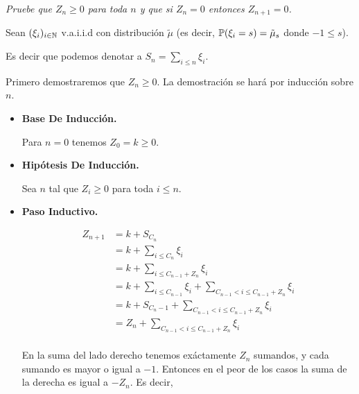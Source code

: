 \emph{
    Pruebe que $Z_n\geq 0$ para toda $n$ y que si $Z_n=0$ entonces $Z_{n+1}=0$.
}

\afterstatement\pn

Sean $(\xi_i)_{i \in \mathbb{N}}$ v.a.i.i.d con distribución $\tilde\mu$ 
(es decir, $\mathbb{P}(\xi_i = s) = \tilde\mu_s$ donde $-1 \leq s$).\pn

Es decir que podemos denotar a $S_n = \sum_{i \leq n} \xi_i$.\pn

Primero demostraremos que $Z_n \geq 0$. La demostración se hará por inducción sobre $n$.

\begin{itemize}
	\item 
        \textbf{Base De Inducción.}
        
        Para $n = 0$ tenemos $Z_0 = k \geq 0$.\pn
        
    \item
        \textbf{Hipótesis De Inducción.}
        
        Sea $n$ tal que $Z_i \geq 0$ para toda $i \leq n$.\pn
        
    \item
        \textbf{Paso Inductivo.}
        
        \begin{align} \label{problema4_2:descomposicion_de_Z_n+1}
            Z_{n+1}     &=  k + S_{C_n}                                                                             \\
                        &=  k + \sum_{i \leq C_n} \xi_i                                                             \\
                        &=  k + \sum_{i \leq C_{n-1} + Z_{n}} \xi_i                                                 \\
                        &=  k + \sum_{i \leq C_{n-1}} \xi_i + \sum_{C_{n-1} < i \leq  C_{n-1} + Z_{n}} \xi_i        \\
                        &=  k + S_{C_n-1} + \sum_{C_{n-1} < i \leq  C_{n-1} +Z_{n}} \xi_i                           \\
                        &=  Z_n + \sum_{C_{n-1} < i \leq  C_{n-1} + Z_{n}} \xi_i                                    \\                        
        \end{align}
        
        En la suma del lado derecho tenemos exáctamente $Z_n$ sumandos, y cada sumando es mayor o igual a $-1$. Entonces
        en el peor de los casos la suma de la derecha es igual a $-Z_n$. Es decir, 
        

\end{itemize}
